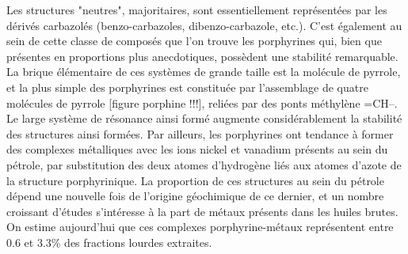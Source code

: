 Les structures "neutres", majoritaires, sont essentiellement représentées par les dérivés carbazolés (benzo-carbazoles, dibenzo-carbazole, etc.). C'est également au sein de cette classe de composés que l'on trouve les porphyrines qui, bien que présentes en proportions plus anecdotiques, possèdent une stabilité remarquable. La brique élémentaire de ces systèmes de grande taille est la molécule de pyrrole, et la plus simple des porphyrines est constituée par l'assemblage de quatre molécules de pyrrole [figure porphine !!!], reliées par des ponts méthylène =CH--. Le large système de résonance ainsi formé augmente considérablement la stabilité des structures ainsi formées. Par ailleurs, les porphyrines ont tendance à former des complexes métalliques avec les ions nickel et vanadium présents au sein du pétrole, par substitution des deux atomes d'hydrogène liés aux atomes d'azote de la structure porphyrinique. La proportion de ces structures au sein du pétrole dépend une nouvelle fois de l'origine géochimique de ce dernier, et un nombre croissant d'études s'intéresse à la part de métaux présents dans les huiles brutes. On estime aujourd'hui que ces complexes porphyrine-métaux représentent entre 0.6 et 3.3\% des fractions lourdes extraites\cite{merdrignac2007physicochemical, speight2004petroleum}.

